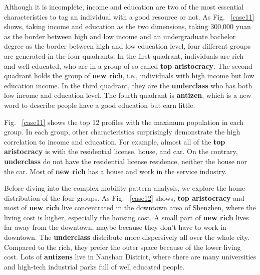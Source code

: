 \documentclass{ieeeaccess}
\begin{document}
Although it is incomplete, income and education are two of the most essential characteristics to tag an individual with a good resource or not.
As Fig. ~\ref{case11} shows, taking income and education as the two dimensions, taking 300,000 yuan as the border between high and low income and an undergraduate bachelor degree as the border between high and low education level, four different groups are generated in the four quadrants. In the first quadrant, individuals are rich and well educated, who are in a group of so-called \textbf{top aristocracy}. The second quadrant holds the group of \textbf{new rich}, i.e., individuals with high income but low education income. In the third quadrant, they are the \textbf{underclass} who has both low income and education level. The fourth quadrant is \textbf{antizen}, which is a new word to describe people have a good education but earn little.


Fig. ~\ref{case11} shows the top 12 profiles with the maximum population in each group. In each group, other characteristics surprisingly demonstrate the high correlation to income and education. For example, almost all of the \textbf{top aristocracy} is with the residential license,  house, and car. On the contrary, \textbf{underclass} do not have the residential license residence, neither the house nor the car. Most of \textbf{new rich} has a house and work in the service industry.

Before diving into the complex mobility pattern analysis, we explore the home distribution of the four groups. As Fig. ~\ref{case12} shows, \textbf{top aristocracy} and most of \textbf{new rich} live concentrated in the downtown area of Shenzhen, where the living cost is higher, especially the housing cost. A small part of \textbf{new rich} lives far away from the downtown, maybe because they don't have to work in downtown. The \textbf{underclass} distribute more dispersively all over the whole city. Compared to the rich, they prefer the outer space because of the lower living cost. Lots of \textbf{antizens} live in Nanshan District, where there are many universities and high-tech industrial parks full of well educated people.
\end{document}
